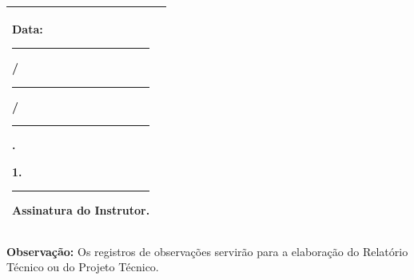 \documentclass[12pt,a4paper]{article}
\begin{document}
\begin{center}
\begin{tabularx}{\textwidth}{|X|X|}
\begin{minipage}[t][2.45cm][t]{\linewidth}
\fontsize{8.5}{9}\selectfont
\centering

Data:
\hspace{0.05cm}
\rule{0.95cm}{0.2pt}
/
\rule{0.95cm}{0.2pt}
/
\rule{0.95cm}{0.2pt}
.

\vspace{1.0cm}

\raggedright
1.\rule{.85cm}{0.5pt}

\vfill

\centering
Assinatura do Instrutor.

\end{minipage}

\\[-1pt]
\hline

\end{tabularx}

\vspace{0.08cm}


\begin{minipage}{0.96\textwidth}
\fontsize{7.5}{8.5}\selectfont
\textbf{Observação:}
Os registros de observações servirão para a elaboração do Relatório Técnico ou do Projeto Técnico.
\end{minipage}

\end{center}
\end{document}
